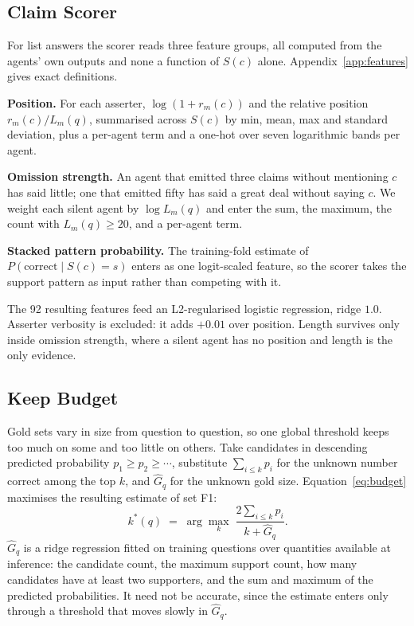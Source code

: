 \documentclass{article}
\begin{document}
\subsection{Claim Scorer}
\label{sec:slotA}

For list answers the scorer reads three feature groups, all computed from the agents'
own outputs and none a function of $S(c)$ alone. Appendix~\ref{app:features} gives exact
definitions.

\textbf{Position.} For each asserter, $\log(1 + r_m(c))$ and the relative position
$r_m(c)/L_m(q)$, summarised across $S(c)$ by min, mean, max and standard deviation, plus
a per-agent term and a one-hot over seven logarithmic bands per agent.

\textbf{Omission strength.} An agent that emitted three claims without mentioning $c$ has
said little; one that emitted fifty has said a great deal without saying $c$. We weight
each silent agent by $\log L_m(q)$ and enter the sum, the maximum, the count with
$L_m(q) \geq 20$, and a per-agent term.

\textbf{Stacked pattern probability.} The training-fold estimate of
$P(\mathrm{correct} \mid S(c) = s)$ enters as one logit-scaled feature, so the scorer
takes the support pattern as input rather than competing with it.

The 92 resulting features feed an L2-regularised logistic regression, ridge $1.0$.
Asserter verbosity is excluded: it adds $+0.01$ over position. Length survives only
inside omission strength, where a silent agent has no position and length is the only
evidence.

\subsection{Keep Budget}
\label{sec:slotB}

Gold sets vary in size from question to question, so one global threshold keeps too much
on some and too little on others. Take candidates in descending predicted probability
$p_1 \geq p_2 \geq \cdots$, substitute $\sum_{i \leq k} p_i$ for the unknown number
correct among the top $k$, and $\hat{G}_q$ for the unknown gold size.
Equation~\ref{eq:budget} maximises the resulting estimate of set F1:
\begin{equation}
\label{eq:budget}
  k^*(q) \;=\; \arg\max_k \; \frac{2 \sum_{i \leq k} p_i}{k + \hat{G}_q}.
\end{equation}
$\hat{G}_q$ is a ridge regression fitted on training questions over quantities available
at inference: the candidate count, the maximum support count, how many candidates have
at least two supporters, and the sum and maximum of the predicted probabilities. It need
not be accurate, since the estimate enters only through a threshold that moves slowly in
$\hat{G}_q$.
\end{document}
